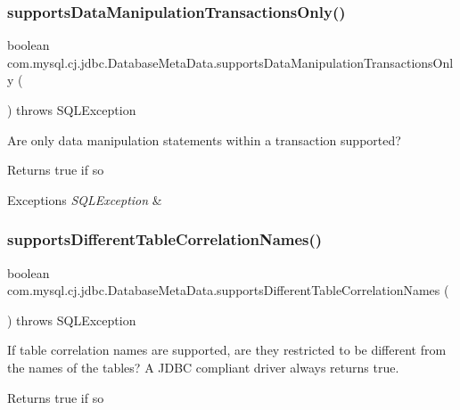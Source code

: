\subsubsection{\texorpdfstring{supports\+Data\+Manipulation\+Transactions\+Only()}{supportsDataManipulationTransactionsOnly()}}
{\footnotesize\ttfamily boolean com.\+mysql.\+cj.\+jdbc.\+Database\+Meta\+Data.\+supports\+Data\+Manipulation\+Transactions\+Only (\begin{DoxyParamCaption}{ }\end{DoxyParamCaption}) throws S\+Q\+L\+Exception}

Are only data manipulation statements within a transaction supported?

\begin{DoxyReturn}{Returns}
true if so 
\end{DoxyReturn}

\begin{DoxyExceptions}{Exceptions}
{\em S\+Q\+L\+Exception} & \\
\hline
\end{DoxyExceptions}
\mbox{\label{classcom_1_1mysql_1_1cj_1_1jdbc_1_1_database_meta_data_aa74636e442e66be1301fcda11e2a253f}} 
\subsubsection{\texorpdfstring{supports\+Different\+Table\+Correlation\+Names()}{supportsDifferentTableCorrelationNames()}}
{\footnotesize\ttfamily boolean com.\+mysql.\+cj.\+jdbc.\+Database\+Meta\+Data.\+supports\+Different\+Table\+Correlation\+Names (\begin{DoxyParamCaption}{ }\end{DoxyParamCaption}) throws S\+Q\+L\+Exception}

If table correlation names are supported, are they restricted to be different from the names of the tables? A J\+D\+BC compliant driver always returns true.

\begin{DoxyReturn}{Returns}
true if so 
\end{DoxyReturn}

